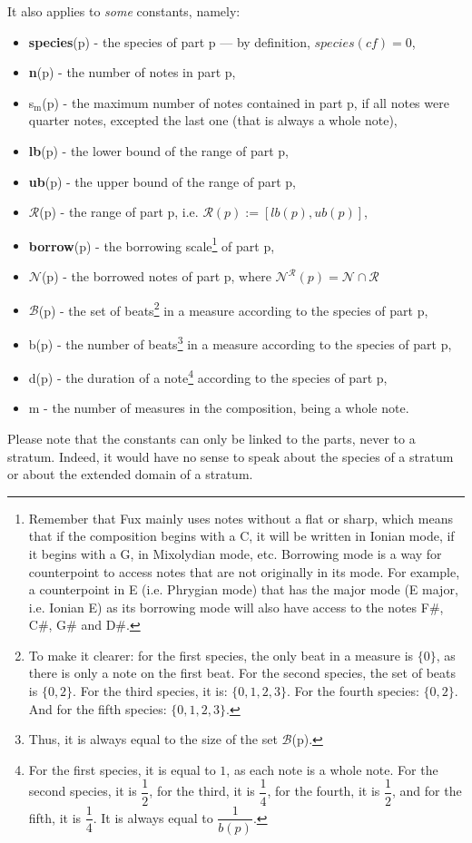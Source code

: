\noindent It also applies to \textit{some} constants, namely:
\begin{itemize}
    \item \textbf{species}(p) - the species of part p --- by definition, $species(\mathit{cf}) = 0$,
    \item \textbf{n}(p) - the number of notes in part p,
    \item s$_\text{m}$(p) - the maximum number of notes contained in part p, if all notes were quarter notes, excepted the last one (that is always a whole note),
    \item \textbf{lb}(p) - the lower bound of the range of part p,
    \item \textbf{ub}(p) - the upper bound of the range of part p,
    \item $\mathcal{R}$(p) - the range of part p, i.e. $\mathcal{R}(p) := [lb(p), ub(p)]$,
    \item \textbf{borrow}(p) - the borrowing scale\footnote{Remember that Fux mainly uses notes without a flat or sharp, which means that if the composition begins with a C, it will be written in Ionian mode, if it begins with a G, in Mixolydian mode, etc. Borrowing mode is a way for counterpoint to access notes that are not originally in its mode. For example, a counterpoint in E (i.e. Phrygian mode) that has the major mode (E major, i.e. Ionian E) as its borrowing mode will also have access to the notes F\#, C\#, G\# and D\#.} of part p,
    \item $\mathcal{N}$(p) - the borrowed notes of part p, where $\mathcal{N}^{\mathcal{R}}(p) = \mathcal{N} \cap \mathcal{R}$
    \item $\mathcal{B}$(p) - the set of beats\footnote{To make it clearer: for the first species, the only beat in a measure is $\{0\}$, as there is only a note on the first beat. For the second species, the set of beats is $\{0, 2\}$. For the third species, it is: $\{0, 1, 2, 3\}$. For the fourth species: $\{0, 2\}$. And for the fifth species: $\{0, 1, 2, 3\}$.} in a measure according to the species of part p,
    \item b(p) - the number of beats\footnote{Thus, it is always equal to the size of the set $\mathcal{B}$(p).} in a measure according to the species of part p,
    \item d(p) - the duration of a note\footnote{For the first species, it is equal to $1$, as each note is a whole note. For the second species, it is $\dfrac{1}{2}$, for the third, it is $\dfrac{1}{4}$, for the fourth, it is $\dfrac{1}{2}$, and for the fifth, it is $\dfrac{1}{4}$. It is always equal to $\dfrac{1}{b(p)}$.} according to the species of part p,
    \item m - the number of measures in the composition,
    being a whole note.
\end{itemize}
Please note that the constants can only be linked to the parts, never to a stratum. Indeed, it would have no sense to speak about the species of a stratum or about the extended domain of a stratum.

